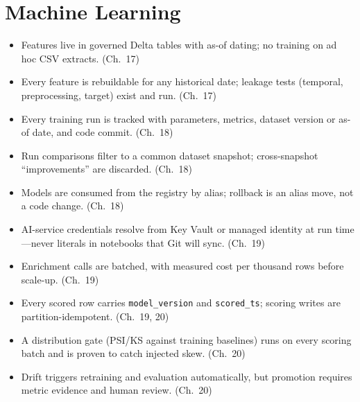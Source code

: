 \section{Machine Learning}
%
\begin{itemize}
    \item[$\square$] Features live in governed Delta tables with as-of dating; no training on
    ad hoc CSV extracts. (Ch.~17)
    \item[$\square$] Every feature is rebuildable for any historical date; leakage tests
    (temporal, preprocessing, target) exist and run. (Ch.~17)
    \item[$\square$] Every training run is tracked with parameters, metrics, dataset version or
    as-of date, and code commit. (Ch.~18)
    \item[$\square$] Run comparisons filter to a common dataset snapshot; cross-snapshot
    ``improvements'' are discarded. (Ch.~18)
    \item[$\square$] Models are consumed from the registry by alias; rollback is an alias move,
    not a code change. (Ch.~18)
    \item[$\square$] AI-service credentials resolve from Key Vault or managed identity at run
    time---never literals in notebooks that Git will sync. (Ch.~19)
    \item[$\square$] Enrichment calls are batched, with measured cost per thousand rows before
    scale-up. (Ch.~19)
    \item[$\square$] Every scored row carries \texttt{model\_version} and \texttt{scored\_ts};
    scoring writes are partition-idempotent. (Ch.~19, 20)
    \item[$\square$] A distribution gate (PSI/KS against training baselines) runs on every
    scoring batch and is proven to catch injected skew. (Ch.~20)
    \item[$\square$] Drift triggers retraining and evaluation automatically, but promotion
    requires metric evidence and human review. (Ch.~20)
\end{itemize}

